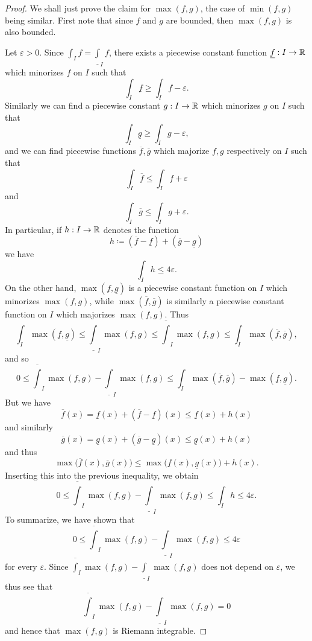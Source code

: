 \begin{proof}
  We shall just prove the claim for \(\max(f, g)\), the case of \(\min(f, g)\) being similar.
  First note that since \(f\) and \(g\) are bounded, then \(\max(f, g)\) is also bounded.

  Let \(\varepsilon > 0\).
  Since \(\int_I f = \underline{\int}_I f\), there exists a piecewise constant function \(\underline{f} : I \to \mathbb{R}\) which minorizes \(f\) on \(I\) such that
  \[
    \int_I \underline{f} \geq \int_I f - \varepsilon.
  \]
  Similarly we can find a piecewise constant \(g : I \to \mathbb{R}\) which minorizes \(g\) on \(I\) such that
  \[
    \int_I \underline{g} \geq \int_I g - \varepsilon,
  \]
  and we can find piecewise functions \(\overline{f}, \overline{g}\) which majorize \(f, g\) respectively on \(I\) such that
  \[
    \int_I \overline{f} \leq \int_I f + \varepsilon
  \]
  and
  \[
    \int_I \overline{g} \leq \int_I g + \varepsilon.
  \]
  In particular, if \(h : I \to \mathbb{R}\) denotes the function
  \[
    h \coloneqq (\overline{f} - \underline{f}) + (\overline{g} - \underline{g})
  \]
  we have
  \[
    \int_I h \leq 4 \varepsilon.
  \]
  On the other hand, \(\max(\underline{f}, \underline{g})\) is a piecewise constant function on \(I\) which minorizes \(\max(f, g)\), while \(\max(\overline{f}, \overline{g})\) is similarly a piecewise constant function on \(I\) which majorizes \(\max(f, g)\).
  Thus
  \[
    \int_I \max(\underline{f}, \underline{g}) \leq \underline{\int}_I \max(f, g) \leq \overline{\int}_I \max(f, g) \leq \int_I \max(\overline{f}, \overline{g}),
  \]
  and so
  \[
    0 \leq \overline{\int}_I \max(f, g) - \underline{\int}_I \max(f, g) \leq \int_I \max(\overline{f}, \overline{g}) - \max(\underline{f}, \underline{g}).
  \]
  But we have
  \[
    \overline{f}(x) = \underline{f}(x) + (\overline{f} - \underline{f})(x) \leq \underline{f}(x) + h(x)
  \]
  and similarly
  \[
    \overline{g}(x) = \underline{g}(x) + (\overline{g} - \underline{g})(x) \leq \underline{g}(x) + h(x)
  \]
  and thus
  \[
    \max\big(\overline{f}(x), \overline{g}(x)\big) \leq \max\big(\underline{f}(x), \underline{g}(x)\big) + h(x).
  \]
  Inserting this into the previous inequality, we obtain
  \[
    0 \leq \overline{\int}_I \max(f, g) - \underline{\int}_I \max(f, g) \leq \int_I h \leq 4 \varepsilon.
  \]
  To summarize, we have shown that
  \[
    0 \leq \overline{\int}_I \max(f, g) - \underline{\int}_I \max(f, g) \leq 4 \varepsilon
  \]
  for every \(\varepsilon\).
  Since \(\overline{\int}_I \max(f, g) - \underline{\int}_I \max(f, g)\) does not depend on \(\varepsilon\), we thus see that
  \[
    \overline{\int}_I \max(f, g) - \underline{\int}_I \max(f, g) = 0
  \]
  and hence that \(\max(f, g)\) is Riemann integrable.
\end{proof}

